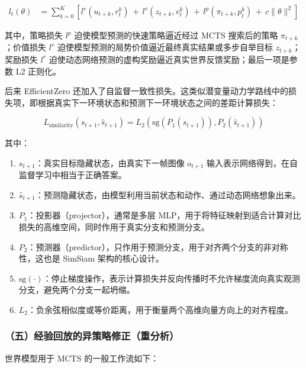 \[
\begin{aligned}
l_t(\theta)
&= \sum_{k=0}^{K}
\left[
l^r(u_{t+k}, r_t^k)
\, + \, l^v(z_{t+k}, v_t^k)
\, + \, l^p(\pi_{t+k}, p_t^k)
\, + \, c \lVert \theta \rVert^2
\right]
\end{aligned}
\]

其中，策略损失 \(l^p\) 迫使模型预测的快速策略逼近经过 MCTS 搜索后的策略 \(\pi_{t+k}\)；价值损失 \(l^v\) 迫使模型预测的局势价值逼近最终真实结果或多步自举目标 \(z_{t+k}\)；奖励损失 \(l^r\) 迫使动态网络预测的虚构奖励逼近真实世界反馈奖励；最后一项是参数 L2 正则化。

后来 EfficientZero 还加入了自监督一致性损失。这类似潜变量动力学路线中的损失项，即根据真实下一环境状态和预测下一环境状态之间的差距计算损失：

\[
L_{\mathrm{similarity}}(s_{t+1}, \hat{s}_{t+1})
= L_2\left(
\mathrm{sg}(P_1(s_{t+1})),
P_2(\hat{s}_{t+1})
\right)
\]

其中：

\begin{enumerate}
\def\labelenumi{\arabic{enumi}.}
\tightlist
\item
  \(s_{t+1}\)：真实目标隐藏状态，由真实下一帧图像 \(o_{t+1}\) 输入表示网络得到，在自监督学习中相当于正确答案。
\item
  \(\hat{s}_{t+1}\)：预测隐藏状态，由模型利用当前状态和动作、通过动态网络想象出来。
\item
  \(P_1\)：投影器（projector），通常是多层 MLP，用于将特征映射到适合计算对比损失的高维空间，同时作用于真实分支和预测分支。
\item
  \(P_2\)：预测器（predictor），只作用于预测分支，用于对齐两个分支的非对称性，这也是 SimSiam 架构的核心设计。
\item
  \(\mathrm{sg}(\cdot)\)：停止梯度操作，表示计算损失并反向传播时不允许梯度流向真实观测分支，避免两个分支一起坍缩。
\item
  \(L_2\)：负余弦相似度或等价距离，用于衡量两个高维向量方向上的对齐程度。
\end{enumerate}

\hypertarget{ux4e94ux7ecfux9a8cux56deux653eux7684ux5f02ux7b56ux7565ux4feeux6b63ux91cdux5206ux6790}{%
\subsubsection{（五）经验回放的异策略修正（重分析）}\label{ux4e94ux7ecfux9a8cux56deux653eux7684ux5f02ux7b56ux7565ux4feeux6b63ux91cdux5206ux6790}}

世界模型用于 MCTS 的一般工作流如下：


